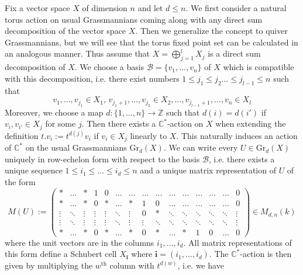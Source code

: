 \documentclass{amsart}
\newcommand{\bfi}{\mathbf{i}}
\newcommand{\C}{\mathbb{C}}
\newcommand{\Gr}{\mathrm{Gr}}
\begin{document}







\noindent 
Fix a vector space $X$ of dimension $n$ and let $d\leq n$. We first consider a natural torus action on usual Grassmannians coming along with any direct sum decomposition of the vector space $X$. Then we generalize the concept to quiver Grassmannians, but we will see that the torus fixed point set can be calculated in an analogous manner. Thus assume that $X=\bigoplus_{j=1}^l X_j$ is a direct sum decomposition of $X$. We choose a basis $\mathcal B=\{v_1,\ldots,v_n\}$ of $X$ which is compatible with this decomposition, i.e. there exist numbers $1\leq j_1\leq j_2\ldots\leq j_{l-1}\leq n$ such that
\[v_1,\ldots,v_{j_1}\in X_1,\,v_{j_1+1},\ldots,v_{j_2}\in X_2,\ldots,v_{j_{l-1}+1},\ldots,v_{n}\in X_l\]
Moreover, we choose a map $d:\{1,\ldots,n\}\to\mathbb{Z}$ such that $d(i)=d(i')$ if $v_i,v_{i'}\in X_{j}$ for some $j$. Then there exists a $\C^\ast$-action on $X$ when extending the definition $t.v_i:=t^{d(j)}v_i$ if $v_i\in X_j$ linearly to $X$. This naturally induces an action of $\C^\ast$ on the usual Grassmannians $\Gr_d(X)$. We can write every $U\in\Gr_d(X)$ uniquely in row-echelon form with respect to the basis $\mathcal B$, i.e. there exists a unique sequence $1\leq i_1\leq\ldots\leq i_d\leq n$ and a unique matrix representation of $U$ of the form
\[M(U):=\begin{pmatrix}\ast&\ldots &\ast &1&0 &\ldots&\ldots&\ldots&\ldots&\ldots&\ldots&\ldots&\ldots&\ldots&0\\\ast&\ldots &\ast&0&\ast&\ldots &\ast&1&0&\ldots&\ldots&\ldots&\ldots&\ldots&0\\\vdots &\ddots&\vdots&\vdots&\vdots &\ddots&\vdots&0&\ast&\ddots&\ddots&\ddots&\ddots&\ddots&\vdots\\\vdots &\ddots&\vdots&\vdots&\vdots &\ddots&\vdots&\vdots&\ddots&\ddots&\ddots&\ddots&\ddots&\ddots&\vdots\\\ast&\ldots &\ast&0&\ast&\ldots &\ast&0&\ast&\ldots&\ast&1&0&\ldots&0\end{pmatrix}\in M_{d,n}(k)\]
where the unit vectors are in the columns $i_1,\ldots,i_d$. All matrix representations of this form define a Schubert cell $X_{\bfi}$ where $\bfi=(i_1,\ldots,i_d)$. The $\C^\ast$-action is then given by multiplying the $w^{\mathrm{th}}$ column with $t^{d(w)}$, i.e. we have
\end{document}
